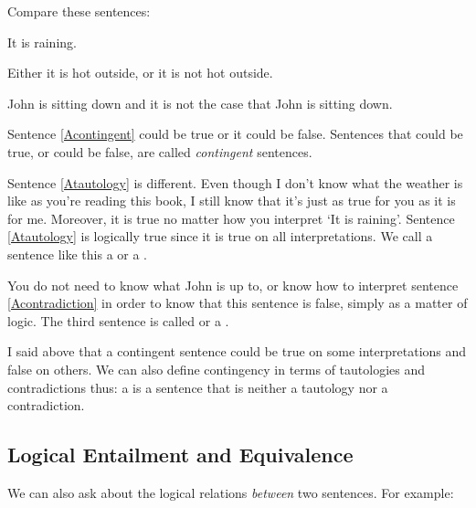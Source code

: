 Compare these sentences:

\begin{earg}
  \item[\ex{Acontingent}] It is raining.
  \item[\ex{Atautology}] Either it is hot outside, or it is not hot outside.
  \item[\ex{Acontradiction}] John is sitting down and it is not the case that John is sitting down.
\end{earg}

Sentence \ref{Acontingent} could be true or it could be false.
Sentences that could be true, or could be false, are called \emph{contingent} sentences.

Sentence \ref{Atautology} is different.
Even though I don't know what the weather is like as you're reading this book, I still know that it's just as true for you as it is for me.
Moreover, it is true no matter how you interpret `It is raining'.
Sentence \ref{Atautology} is logically true since it is true on all interpretations.
We call a sentence like this a  or a .

You do not need to know what John is up to, or know how to interpret sentence \ref{Acontradiction} in order to know that this sentence is false, simply as a matter of logic.
The third sentence is called  or a .

I said above that a contingent sentence could be true on some interpretations and false on others.
We can also define contingency in terms of tautologies and contradictions thus: a  is a sentence that is neither a tautology nor a contradiction.


\subsection{Logical Entailment and Equivalence}
We can also ask about the logical relations \emph{between} two sentences. For example:


